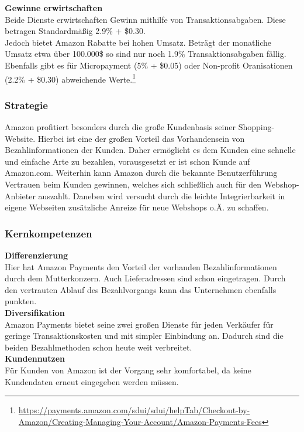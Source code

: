 \textbf{Gewinne erwirtschaften}\\
Beide Dienste erwirtschaften Gewinn mithilfe von Transaktionsabgaben. Diese betragen Standardmäßig 2.9\% + \$0.30.\\
Jedoch bietet Amazon Rabatte bei hohen Umsatz. Beträgt der monatliche Umsatz etwa über 100.000\$ so sind nur noch 1.9\%  Transaktionsabgaben fällig.
Ebenfalls gibt es für Micropayment (5\% + \$0.05) oder Non-profit Oranisationen (2.2\% + \$0.30) abweichende Werte.\footnote{\url{https://payments.amazon.com/sdui/sdui/helpTab/Checkout-by-Amazon/Creating-Managing-Your-Account/Amazon-Payments-Fees}}

\subsubsection{Strategie}
Amazon profitiert besonders durch die große Kundenbasis seiner Shopping-Website. Hierbei ist eine der großen Vorteil das Vorhandensein von Bezahlinformationen der Kunden. Daher ermöglicht es dem Kunden eine schnelle und einfache Arte zu bezahlen, vorausgesetzt er ist schon Kunde auf Amazon.com. Weiterhin kann Amazon durch die bekannte Benutzerführung Vertrauen beim Kunden gewinnen, welches sich schließlich auch für den Webshop-Anbieter auszahlt. Daneben wird versucht durch die leichte Integrierbarkeit in eigene Webseiten zusätzliche Anreize für neue Webshops o.Ä. zu schaffen. 

\subsubsection{Kernkompetenzen}
\textbf{Differenzierung}\\
Hier hat Amazon Payments den Vorteil der vorhanden Bezahlinformationen durch dem Mutterkonzern. Auch Lieferadressen sind schon eingetragen. Durch den vertrauten Ablauf des Bezahlvorgangs kann das Unternehmen ebenfalls punkten.\\

\textbf{Diversifikation}\\
Amazon Payments bietet seine zwei großen Dienste für jeden Verkäufer für geringe Transaktionskosten und mit simpler Einbindung an. Dadurch sind die beiden Bezahlmethoden schon heute weit verbreitet.\\

\textbf{Kundennutzen}\\
Für Kunden von Amazon ist der Vorgang sehr komfortabel, da keine Kundendaten erneut eingegeben werden müssen.\\
